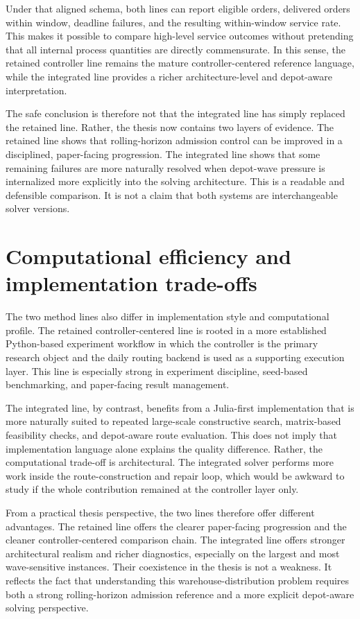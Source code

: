 Under that aligned schema, both lines can report eligible orders, delivered orders within window, deadline failures, and the resulting within-window service rate. This makes it possible to compare high-level service outcomes without pretending that all internal process quantities are directly commensurate. In this sense, the retained controller line remains the mature controller-centered reference language, while the integrated line provides a richer architecture-level and depot-aware interpretation.

The safe conclusion is therefore not that the integrated line has simply replaced the retained line. Rather, the thesis now contains two layers of evidence. The retained line shows that rolling-horizon admission control can be improved in a disciplined, paper-facing progression. The integrated line shows that some remaining failures are more naturally resolved when depot-wave pressure is internalized more explicitly into the solving architecture. This is a readable and defensible comparison. It is not a claim that both systems are interchangeable solver versions.

\section{Computational efficiency and implementation trade-offs}

The two method lines also differ in implementation style and computational profile. The retained controller-centered line is rooted in a more established Python-based experiment workflow in which the controller is the primary research object and the daily routing backend is used as a supporting execution layer. This line is especially strong in experiment discipline, seed-based benchmarking, and paper-facing result management.

The integrated line, by contrast, benefits from a Julia-first implementation that is more naturally suited to repeated large-scale constructive search, matrix-based feasibility checks, and depot-aware route evaluation. This does not imply that implementation language alone explains the quality difference. Rather, the computational trade-off is architectural. The integrated solver performs more work inside the route-construction and repair loop, which would be awkward to study if the whole contribution remained at the controller layer only.

From a practical thesis perspective, the two lines therefore offer different advantages. The retained line offers the clearer paper-facing progression and the cleaner controller-centered comparison chain. The integrated line offers stronger architectural realism and richer diagnostics, especially on the largest and most wave-sensitive instances. Their coexistence in the thesis is not a weakness. It reflects the fact that understanding this warehouse-distribution problem requires both a strong rolling-horizon admission reference and a more explicit depot-aware solving perspective.
